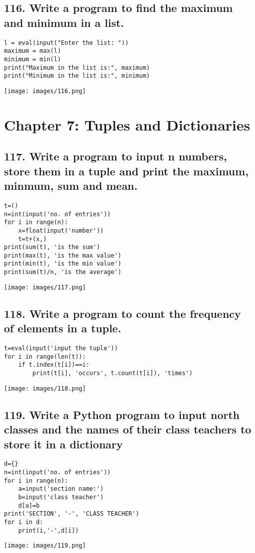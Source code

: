 \documentclass[12pt]{article}
\begin{document}
\subsection*{116. Write a program to find the maximum and minimum in a list.}
\begin{verbatim}
l = eval(input("Enter the list: "))
maximum = max(l)
minimum = min(l)
print("Maximum in the list is:", maximum)
print("Minimum in the list is:", minimum)
\end{verbatim}
\texttt{[image: images/116.png]}


\section*{Chapter 7: Tuples and Dictionaries}

\subsection*{117. Write a program to input n numbers, store them in a tuple and print the maximum, minmum, sum and mean.}
\begin{verbatim}
t=()
n=int(input('no. of entries'))
for i in range(n):
    x=float(input('number'))
    t=t+(x,)
print(sum(t), 'is the sum')
print(max(t), 'is the max value')
print(min(t), 'is the min value')
print(sum(t)/n, 'is the average')
\end{verbatim}
\texttt{[image: images/117.png]}

\subsection*{118. Write a program to count the frequency of elements in a tuple.}
\begin{verbatim}
t=eval(input('input the tuple'))
for i in range(len(t)):
 	if t.index(t[i])==i:
 		print(t[i], 'occurs', t.count(t[i]), 'times')
\end{verbatim}
\texttt{[image: images/118.png]}

\subsection*{119. Write a Python program to input north classes and the names of their class teachers to store it in a dictionary}
\begin{verbatim}
d={}
n=int(input('no. of entries'))
for i in range(n):
    a=input('section name:')
    b=input('class teacher')
    d[a]=b
print('SECTION', '-', 'CLASS TEACHER')
for i in d:
    print(i,'-',d[i])
\end{verbatim}
\texttt{[image: images/119.png]}
\end{document}
